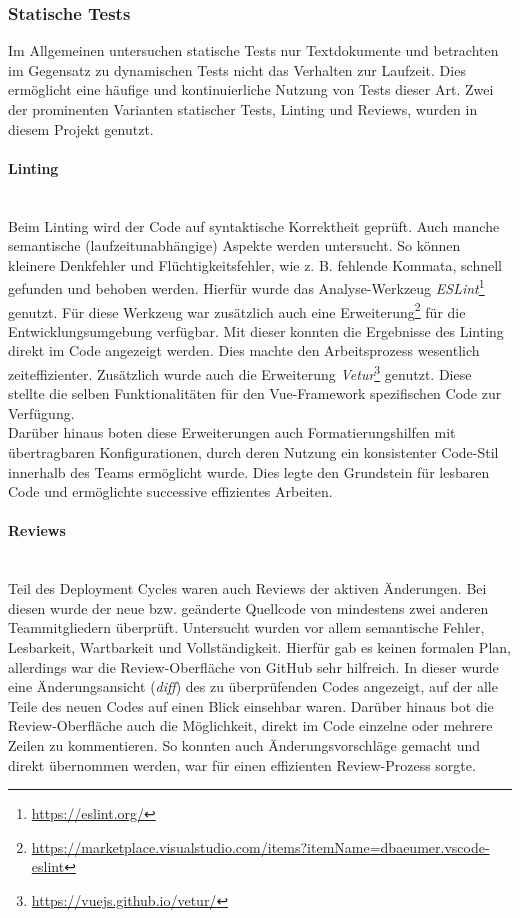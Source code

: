 \documentclass[10pt, a4paper]{article}
\begin{document}
\subsubsection*{Statische Tests}
Im Allgemeinen untersuchen statische Tests nur Textdokumente und betrachten im Gegensatz zu dynamischen Tests nicht das Verhalten zur Laufzeit.
Dies ermöglicht eine häufige und kontinuierliche Nutzung von Tests dieser Art.
Zwei der prominenten Varianten statischer Tests, Linting und Reviews, wurden in diesem Projekt genutzt.

\paragraph*{Linting}$~$ \\
Beim Linting wird der Code auf syntaktische Korrektheit geprüft.
Auch manche semantische (laufzeitunabhängige) Aspekte werden untersucht.
So können kleinere Denkfehler und Flüchtigkeitsfehler, wie z. B. fehlende Kommata, schnell gefunden und behoben werden.
Hierfür wurde das Analyse-Werkzeug \textit{ESLint}\footnote{\raggedright\url{https://eslint.org/}} genutzt.
Für diese Werkzeug war zusätzlich auch eine Erweiterung\footnote{\raggedright\url{https://marketplace.visualstudio.com/items?itemName=dbaeumer.vscode-eslint}} für die Entwicklungsumgebung verfügbar.
Mit dieser konnten die Ergebnisse des Linting direkt im Code angezeigt werden.
Dies machte den Arbeitsprozess wesentlich zeiteffizienter.
Zusätzlich wurde auch die Erweiterung \textit{Vetur}\footnote{\raggedright\url{https://vuejs.github.io/vetur/}} genutzt.
Diese stellte die selben Funktionalitäten für den Vue-Framework spezifischen Code zur Verfügung.
\\
Darüber hinaus boten diese Erweiterungen auch Formatierungshilfen mit übertragbaren Konfigurationen, durch deren Nutzung ein konsistenter Code-Stil
innerhalb des Teams ermöglicht wurde. Dies legte den Grundstein für lesbaren Code und ermöglichte successive effizientes Arbeiten.

\paragraph*{Reviews}$~$ \\
Teil des Deployment Cycles waren auch Reviews der aktiven Änderungen.
Bei diesen wurde der neue bzw. geänderte Quellcode von mindestens zwei anderen Teammitgliedern überprüft.
Untersucht wurden vor allem semantische Fehler, Lesbarkeit, Wartbarkeit und Vollständigkeit.
Hierfür gab es keinen formalen Plan, allerdings war die Review-Oberfläche von GitHub sehr hilfreich.
In dieser wurde eine Änderungsansicht (\textit{diff}) des zu überprüfenden Codes angezeigt, auf der alle Teile des neuen Codes auf einen Blick einsehbar waren.
Darüber hinaus bot die Review-Oberfläche auch die Möglichkeit, direkt im Code einzelne oder mehrere Zeilen zu kommentieren.
So konnten auch Änderungsvorschläge gemacht und direkt übernommen werden, war für einen effizienten Review-Prozess sorgte.
\end{document}
